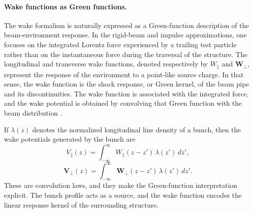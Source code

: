 \documentclass[11pt,a4paper]{article}
\begin{document}
\begin{sloppypar}
\paragraph{Wake functions as Green functions.}
The wake formalism is naturally expressed as a Green-function description of the beam-environment response. In the rigid-beam and impulse approximations, one focuses on the integrated Lorentz force experienced by a trailing test particle rather than on the instantaneous force during the traversal of the structure. The longitudinal and transverse wake functions, denoted respectively by $W_{\parallel}$ and $\mathbf W_{\perp}$, represent the response of the environment to a point-like source charge. In that sense, the wake function is the shock response, or Green kernel, of the beam pipe and its discontinuities. The wake function is associated with the integrated force, and the wake potential is obtained by convolving that Green function with the beam distribution \cite{metral_wake_2021-1}.

If $\lambda(z)$ denotes the normalized longitudinal line density of a bunch, then the wake potentials generated by the bunch are
\begin{equation}
V_{\parallel}(z)
=
\int_{-\infty}^{\infty}
W_{\parallel}(z-z')\,\lambda(z')\,dz',
\label{eq:long_wake_potential}
\end{equation}
\begin{equation}
\mathbf V_{\perp}(z)
=
\int_{-\infty}^{\infty}
\mathbf W_{\perp}(z-z')\,\lambda(z')\,dz'.
\label{eq:trans_wake_potential}
\end{equation}
These are convolution laws, and they make the Green-function interpretation explicit. The bunch profile acts as a source, and the wake function encodes the linear response kernel of the surrounding structure. 


\end{sloppypar}
\end{document}
